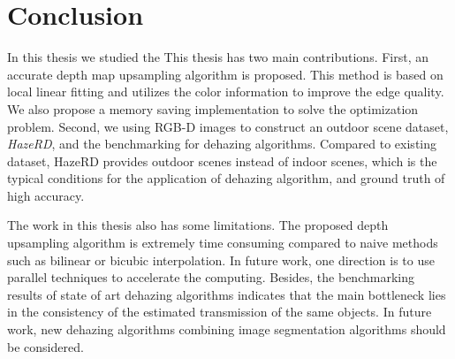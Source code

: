 \chapter{Conclusion}
\label{cha4}
In this thesis we studied the 
This thesis has two main contributions. First, an accurate depth map upsampling algorithm is proposed. This method is based on local linear fitting and utilizes the color information to improve the edge quality. We also propose a memory saving implementation to solve the optimization problem. Second, we using RGB-D images to construct an outdoor scene dataset, \emph{HazeRD}, and the benchmarking for dehazing algorithms. Compared to existing dataset, HazeRD provides outdoor scenes instead of indoor scenes, which is the typical conditions for the application of dehazing algorithm, and ground truth of high accuracy. 

The work in this thesis also has some limitations. The proposed depth upsampling algorithm is extremely time consuming compared to naive methods such as bilinear or bicubic interpolation. In future work, one direction is to use parallel techniques to accelerate the computing. Besides, the benchmarking results of state of art dehazing algorithms indicates that the main bottleneck lies in the consistency of the estimated transmission of the same objects. In future work, new dehazing algorithms combining image segmentation algorithms should be considered. 

